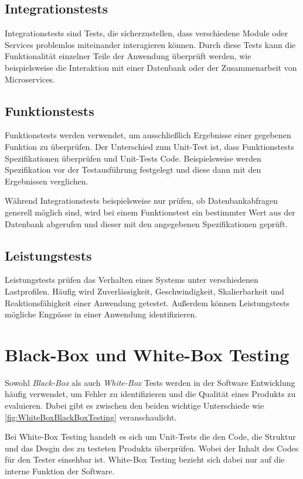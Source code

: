 \documentclass[a4paper, fontsize=11pt, parskip=half, twoside]{scrreprt}
\begin{document}
	\subsection{Integrationstests}
	Integrationstests sind Tests, die sicherzustellen, dass verschiedene Module oder Services problemlos miteinander interagieren können. 
	Durch diese Tests kann die Funktionalität einzelner Teile der Anwendung überprüft werden, wie beispielsweise die Interaktion mit einer Datenbank oder der Zusammenarbeit von Microservices.
	
	\subsection{Funktionstests}
	Funktionstests werden verwendet, um ausschließlich Ergebnisse einer gegebenen Funktion zu überprüfen.
	Der Unterschied zum Unit-Test ist, dass Funktionstests Spezifikationen überprüfen und Unit-Tests Code.
	Beispielsweise werden Spezifikation vor der Testausführung festgelegt und diese dann mit den Ergebnissen verglichen.
	
	Während Integrationstests beispielsweise nur prüfen, ob Datenbankabfragen generell möglich sind, wird bei einem Funktionstest ein bestimmter Wert aus der Datenbank abgerufen und dieser mit den angegebenen Spezifikationen geprüft.
	
	\subsection{Leistungstests}
	Leistungstests prüfen das Verhalten eines Systems unter verschiedenen Lastprofilen. 
	Häufig wird Zuverlässigkeit, Geschwindigkeit, Skalierbarkeit und Reaktionsfähigkeit einer Anwendung getestet. 
	Außerdem können Leistungstests mögliche Engpässe in einer Anwendung identifizieren.
	
	
	\section{Black-Box und White-Box Testing}
	Sowohl \emph{Black-Box} als auch \emph{White-Box} Tests werden in der Software Entwicklung häufig verwendet, um Fehler zu identifizieren und die Qualität eines Produkts zu evaluieren. 
	Dabei gibt es zwischen den beiden wichtige Unterschiede wie \autoref{fig:WhiteBoxBlackBoxTesting} veranschaulicht.
	
	Bei White-Box Testing handelt es sich um Unit-Tests die den Code, die Struktur und das Desgin des zu testeten Produkts überprüfen. 
	Wobei der Inhalt des Codes für den Tester einsehbar ist.
	White-Box Testing bezieht sich dabei nur auf die interne Funktion der Software.
	
\end{document}
